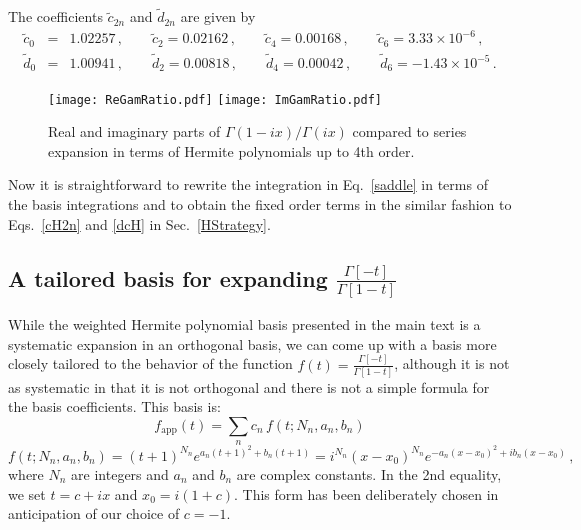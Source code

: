 \documentclass[a4,letterpaper,11pt]{article}
\newcommand{\be}{\begin{equation}}
\newcommand{\ee}{\end{equation}}
\newcommand{\bea}{\begin{eqnarray}}
\newcommand{\eea}{\end{eqnarray}}
\newcommand{\eq}[1]{Eq.~\eqref{#1}}
\newcommand{\eqs}[2]{Eqs.~\eqref{#1} and \eqref{#2}}
\begin{document}
The coefficients ${\tilde c}_{2n}$ and ${\tilde d}_{2n}$ are given by
\bea
\label{cndn}
{\tilde c}_0& =&1.02257\,,\qquad {\tilde c}_2 = 0.02162\,,\qquad {\tilde c}_4= 0.00168\,, 
\qquad {\tilde c}_6= 3.33\times 10^{-6}\,,
\\ 
{\tilde d}_0& =&1.00941\,,\qquad {\tilde d}_2 = 0.00818\,,\qquad {\tilde d}_4= 0.00042\,,
\qquad {\tilde d}_6= -1.43 \times 10^{-5}\,.
\eea

\begin{figure}
\centerline{
\texttt{[image: ReGamRatio.pdf]}
\hskip 0.5cm
\texttt{[image: ImGamRatio.pdf]}
}
\vskip -0.2cm
\caption[1]{Real and imaginary parts of $\Gamma(1-ix)/\Gamma(ix)$ compared to series expansion in terms of Hermite polynomials up to 4th order.}
\label{fig:Gamma3} 
\end{figure}

Now it is straightforward to rewrite the integration in \eq{saddle} in terms of the basis integrations and to obtain the fixed order terms in the similar fashion to \eqs{cH2n}{dcH} in Sec.~\ref{HStrategy}.


\subsection{A tailored basis for expanding $\frac{\Gamma[-t]}{\Gamma[1-t]}$}

While the weighted Hermite polynomial basis presented in the main text is a systematic expansion in an orthogonal basis, we can come up with a basis more closely tailored to the behavior of the function $f(t)=\frac{\Gamma[-t]}{\Gamma[1-t]}$, although it is not as systematic in that it is not orthogonal and there is not a simple formula for the basis coefficients. This basis is:
\be\label{expansion}
f_\text{app} (t)= \sum_n c_n\, f(t; N_n,a_n,b_n)
\ee
\be\label{basis}
f(t; N_n,a_n,b_n)= (t+1)^{N_n}e^{a_n (t+1)^2 +b_n (t+1)}= i^{N_n}(x-x_0)^{N_n} e^{-a_n (x-x_0)^2 +ib_n (x-x_0)}
\,,\ee
where $N_n$ are integers and $a_n$ and $b_n$ are complex constants.
In the 2nd equality, we set $t=c+i x$ and $x_0=i(1+c)$. 
This form has been deliberately chosen in anticipation of our choice of $c = -1$. 
\end{document}
